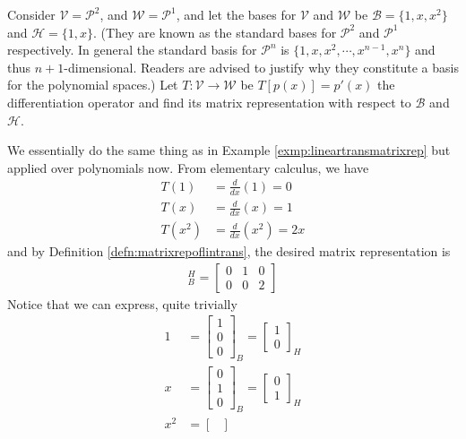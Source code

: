 \begin{exmp}
\label{exmp:lineartransderivative}
Consider $\mathcal{V} = \mathcal{P}^2$, and $\mathcal{W} = \mathcal{P}^1$, and let the bases for $\mathcal{V}$ and $\mathcal{W}$ be $\mathcal{B} = \{1, x, x^2\}$ and $\mathcal{H} = \{1, x\}$. (They are known as the standard bases for $\mathcal{P}^2$ and $\mathcal{P}^1$ respectively. In general the standard basis for $\mathcal{P}^n$ is $\{1, x, x^2, \cdots, x^{n-1}, x^n\}$ and thus $n+1$-dimensional. Readers are advised to justify why they constitute a basis for the polynomial spaces.) Let $T: \mathcal{V} \to \mathcal{W}$ be $T[p(x)] = p'(x)$ the differentiation operator and find its matrix representation with respect to $\mathcal{B}$ and $\mathcal{H}$.
\end{exmp}
\begin{solution}
We essentially do the same thing as in Example \ref{exmp:lineartransmatrixrep} but applied over polynomials now. From elementary calculus, we have
\begin{align*}
T(1) &= \frac{d}{dx}(1) = 0 \\
T(x) &= \frac{d}{dx}(x) = 1 \\
T(x^2) &= \frac{d}{dx}(x^2) = 2x
\end{align*}
and by Definition \ref{defn:matrixrepoflintrans}, the desired matrix representation is
\begin{align*}
[T]_B^H = 
\begin{bmatrix}
0 & 1 & 0 \\
0 & 0 & 2
\end{bmatrix}
\end{align*}
Notice that we can express, quite trivially
\begin{align*}
1 &= \begin{bmatrix}
1 \\
0 \\
0
\end{bmatrix}_B
=
\begin{bmatrix}
1 \\
0
\end{bmatrix}_H \\
x &= \begin{bmatrix}
0 \\
1 \\
0
\end{bmatrix}_B
=
\begin{bmatrix}
0 \\
1
\end{bmatrix}_H \\
x^2 &= \begin{bmatrix}

\end{bmatrix}
\end{align*}
\end{solution}
